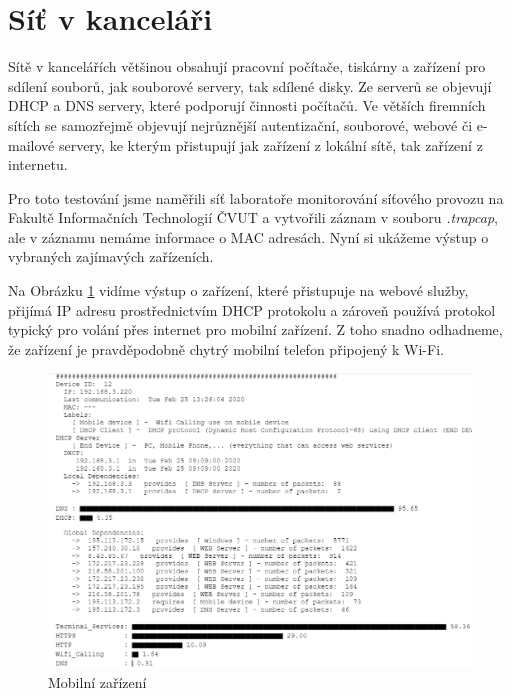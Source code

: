 \documentclass[thesis=B,czech,hidelinks]{FITthesis}[2019/03/21]
\begin{document}
    \clearpage
    \newpage
    \section{Síť v kanceláři}
    Sítě v kancelářích většinou obsahují pracovní počítače, tiskárny a zařízení pro sdílení souborů, jak souborové servery, tak sdílené disky. Ze serverů se objevují DHCP a DNS servery, které podporují činnosti počítačů. Ve větších firemních sítích se samozřejmě objevují nejrůznější autentizační, souborové, webové či e-mailové servery, ke kterým přistupují jak zařízení z lokální sítě, tak zařízení z internetu. 
    
    Pro toto testování jsme naměřili síť laboratoře monitorování síťového provozu na Fakultě Informačních Technologií ČVUT a vytvořili záznam v souboru \emph{.trapcap}, ale v záznamu nemáme informace o MAC adresách. Nyní si ukážeme výstup o vybraných zajímavých zařízeních.

    Na Obrázku \ref{Mobil} vidíme výstup o zařízení, které přistupuje na webové služby, přijímá IP adresu prostřednictvím DHCP protokolu a zároveň používá protokol typický pro volání přes internet pro mobilní zařízení. Z toho snadno odhadneme, že zařízení je pravděpodobně chytrý mobilní telefon připojený k Wi-Fi.
    
    \begin{figure}[h!]
        \centering
        \includegraphics[width=\textwidth]{FITKancl_MObile.png}
        \caption[Ukázka měření: Mobilní zařízení v kancelářské síti]{Mobilní zařízení}
        \label{Mobil}
    \end{figure}
    
\end{document}
